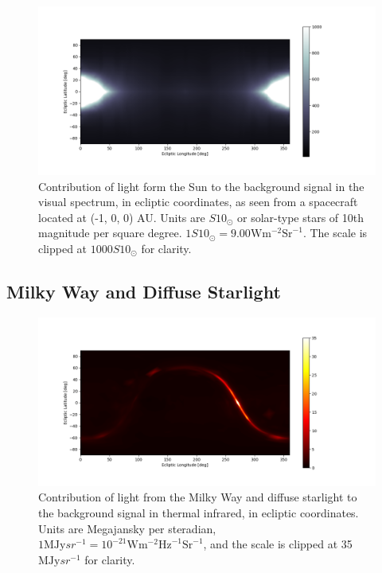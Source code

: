 \begin{figure}[htbp]
 \centering
 \includegraphics[width=1.0\textwidth]{img/background_vis_zodiac.png}
 \caption{Contribution of light form the Sun to the background signal in the visual spectrum, in ecliptic coordinates, as seen from a spacecraft located at (-1, 0, 0) AU. Units are $S10_\odot$ or solar-type stars of 10th magnitude per square degree. $1S10_\odot = 9.00\mathrm{W}\mathrm{m}^{-2}\mathrm{Sr}^{-1}$. The scale is clipped at $1000 S10_\odot$ for clarity.}
 \label{fig:solarvisbackground}
\end{figure}


\subsection{Milky Way and Diffuse Starlight}



\begin{figure}[htbp]
 \centering
 \includegraphics[width=1.0\textwidth]{img/background_tir_stars.png}
 \caption{Contribution of light from the Milky Way and diffuse starlight to the background signal in thermal infrared, in ecliptic coordinates. Units are Megajansky per steradian, $1 \mathrm{MJy}{sr}^{-1} = 10^{-21} \mathrm{W}\mathrm{m}^{-2}\mathrm{Hz}^{-1}\mathrm{Sr}^{-1}$, and the scale is clipped at 35 $\mathrm{MJy}{sr}^{-1}$ for clarity.}
 \label{fig:starstirbackground}
\end{figure}




